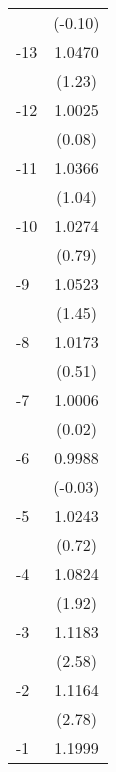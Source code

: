 {\begin{tabular}{l*{1}{c}}
                                   &     (-0.10)         \\
[1em]
  -13                              &      1.0470         \\
                                   &      (1.23)         \\
[1em]
  -12                              &      1.0025         \\
                                   &      (0.08)         \\
[1em]
  -11                              &      1.0366         \\
                                   &      (1.04)         \\
[1em]
  -10                              &      1.0274         \\
                                   &      (0.79)         \\
[1em]
   -9                              &      1.0523         \\
                                   &      (1.45)         \\
[1em]
   -8                              &      1.0173         \\
                                   &      (0.51)         \\
[1em]
   -7                              &      1.0006         \\
                                   &      (0.02)         \\
[1em]
   -6                              &      0.9988         \\
                                   &     (-0.03)         \\
[1em]
   -5                              &      1.0243         \\
                                   &      (0.72)         \\
[1em]
   -4                              &      1.0824\sym{*}  \\
                                   &      (1.92)         \\
[1em]
   -3                              &      1.1183\sym{**} \\
                                   &      (2.58)         \\
[1em]
   -2                              &      1.1164\sym{***}\\
                                   &      (2.78)         \\
[1em]
   -1                              &      1.1999\sym{***}\\

\end{tabular}}
